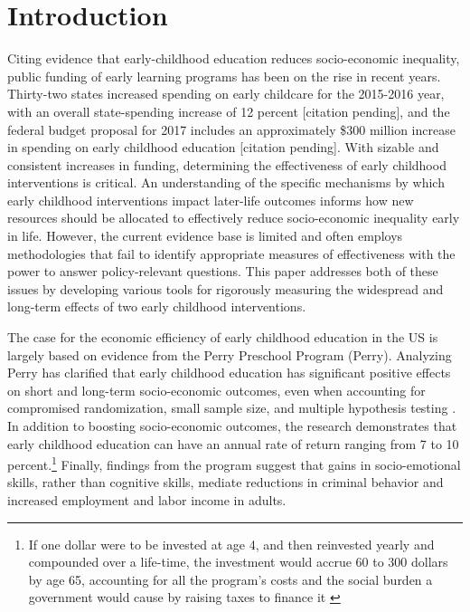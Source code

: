 \singlespacing
\pagebreak
\tableofcontents
\listoffigures
\listoftables
\pagebreak

\section{Introduction}

Citing evidence that early-childhood education reduces socio-economic inequality, public funding of early learning programs has been on the rise in recent years. Thirty-two states increased spending on early childcare for the 2015-2016 year, with an overall state-spending increase of 12 percent [citation pending], and the federal budget proposal for 2017 includes an approximately \$300 million increase in spending on early childhood education [citation pending]. With sizable and consistent increases in funding, determining the effectiveness of early childhood interventions is critical. An understanding of the specific mechanisms by which early childhood interventions impact later-life outcomes informs how new resources should be allocated to effectively reduce socio-economic inequality early in life. However, the current evidence base is limited and often employs methodologies that fail to identify appropriate measures of effectiveness with the power to answer policy-relevant questions. This paper addresses both of these issues by developing various tools for rigorously measuring the widespread and long-term effects of two early childhood interventions. 

The case for the economic efficiency of early childhood education in the US is largely based on evidence from the Perry Preschool Program (Perry). Analyzing Perry has clarified that early childhood education has significant positive effects on short and long-term socio-economic outcomes, even when accounting for compromised randomization, small sample size, and multiple hypothesis testing \citep{Heckman_Moon_etal_2010_QE}. In addition to boosting socio-economic outcomes, the research demonstrates that early childhood education can have an annual rate of return ranging from 7 to 10 percent.\footnote{If one dollar were to be invested at age 4, and then reinvested yearly and compounded over a life-time, the investment would accrue 60 to 300 dollars by age 65, accounting for all the program's costs and the social burden a government would cause by raising taxes to finance it \citep{Heckman_Moon_etal_2010_RateofReturn}} Finally, findings from the program suggest that gains in socio-emotional skills, rather than cognitive skills, mediate reductions in criminal behavior and increased employment and labor income in adults\citep{Heckman_Pinto_etal_2013_PerryFactor}.

